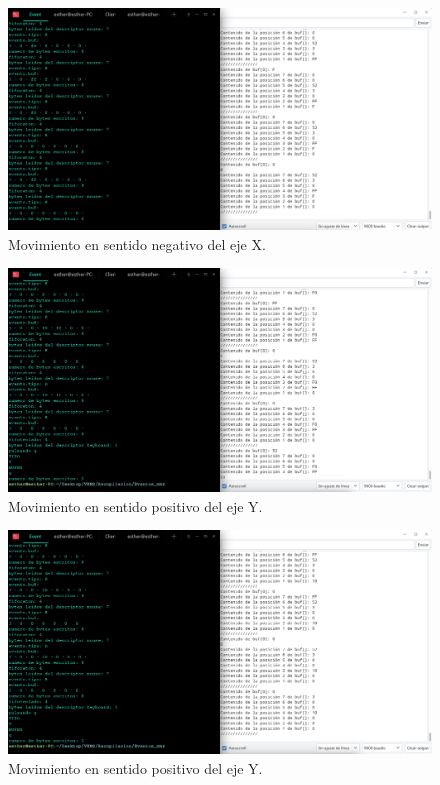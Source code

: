     \begin{figure}
    \centering
    \includegraphics[scale = 0.5]{capitulo_04/figuras_dir/movx-.jpg}
    \caption{Movimiento en sentido negativo del eje X.}
    \end{figure}

    \begin{figure}
    \centering
    \includegraphics[scale = 0.5]{capitulo_04/figuras_dir/movy+.jpg}
    \caption{Movimiento en sentido positivo del eje Y.}
    \end{figure}

    \begin{figure}
    \centering
    \includegraphics[scale = 0.5]{capitulo_04/figuras_dir/movy-.jpg}
    \caption{Movimiento en sentido positivo del eje Y.}
    \end{figure}

